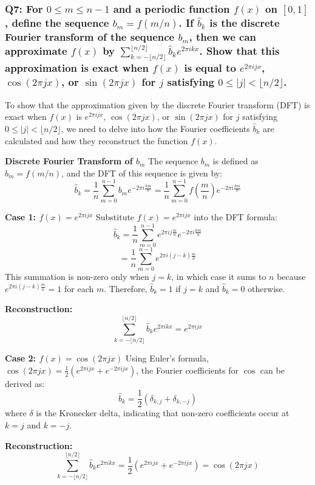 \documentclass[8pt]{article}
\begin{document}
{\subsubsection*{Q7:
For \(0 \leq m \leq n - 1\) and a periodic function \(f(x)\) on \([0,1]\), define the sequence \(b_m = f(m/n)\). If \(\hat{b}_k\) is the discrete Fourier transform of the sequence \(b_m\), then we can approximate \(f(x)\) by \(\sum_{k=-\lfloor n/2 \rfloor}^{\lfloor n/2 \rfloor} \hat{b}_k e^{2\pi ikx}\). Show that this approximation is exact when \(f(x)\) is equal to \(e^{2\pi ijx}\), \(\cos(2\pi jx)\), or \(\sin(2\pi jx)\) for \(j\) satisfying \(0 \leq |j| < \lfloor n/2 \rfloor\).}

To show that the approximation given by the discrete Fourier transform (DFT) is exact when \(f(x)\) is \(e^{2\pi ijx}\), \(\cos(2\pi jx)\), or \(\sin(2\pi jx)\) for \(j\) satisfying \(0 \leq |j| < \lfloor n/2 \rfloor\), we need to delve into how the Fourier coefficients \(\hat{b}_k\) are calculated and how they reconstruct the function \(f(x)\).

\textbf{Discrete Fourier Transform of \(b_m\)}
The sequence \(b_m\) is defined as \(b_m = f(m/n)\), and the DFT of this sequence is given by:
\[
\hat{b}_k = \frac{1}{n} \sum_{m=0}^{n-1} b_m e^{-2\pi i \frac{km}{n}} = \frac{1}{n} \sum_{m=0}^{n-1} f\left(\frac{m}{n}\right) e^{-2\pi i \frac{km}{n}}
\]

\textbf{Case 1: \(f(x) = e^{2\pi ijx}\)}
Substitute \(f(x) = e^{2\pi ijx}\) into the DFT formula:
\[
\hat{b}_k = \frac{1}{n} \sum_{m=0}^{n-1} e^{2\pi ij\frac{m}{n}} e^{-2\pi i \frac{km}{n}}
\]
\[
= \frac{1}{n} \sum_{m=0}^{n-1} e^{2\pi i(j-k)\frac{m}{n}}
\]
This summation is non-zero only when \(j = k\), in which case it sums to \(n\) because \(e^{2\pi i(j-k)\frac{m}{n}} = 1\) for each \(m\). Therefore, \(\hat{b}_k = 1\) if \(j = k\) and \(\hat{b}_k = 0\) otherwise.

\textbf{Reconstruction:}
\[
\sum_{k=-\lfloor n/2 \rfloor}^{\lfloor n/2 \rfloor} \hat{b}_k e^{2\pi ikx} = e^{2\pi ijx}
\]

\textbf{Case 2: \(f(x) = \cos(2\pi jx)\)}
Using Euler's formula, \(\cos(2\pi jx) = \frac{1}{2} (e^{2\pi ijx} + e^{-2\pi ijx})\), the Fourier coefficients for \(\cos\) can be derived as:
\[
\hat{b}_k = \frac{1}{2}(\delta_{k, j} + \delta_{k, -j})
\]
where \(\delta\) is the Kronecker delta, indicating that non-zero coefficients occur at \(k = j\) and \(k = -j\).

\textbf{Reconstruction:}
\[
\sum_{k=-\lfloor n/2 \rfloor}^{\lfloor n/2 \rfloor} \hat{b}_k e^{2\pi ikx} = \frac{1}{2} (e^{2\pi ijx} + e^{-2\pi ijx}) = \cos(2\pi jx)
\]

}
\end{document}
